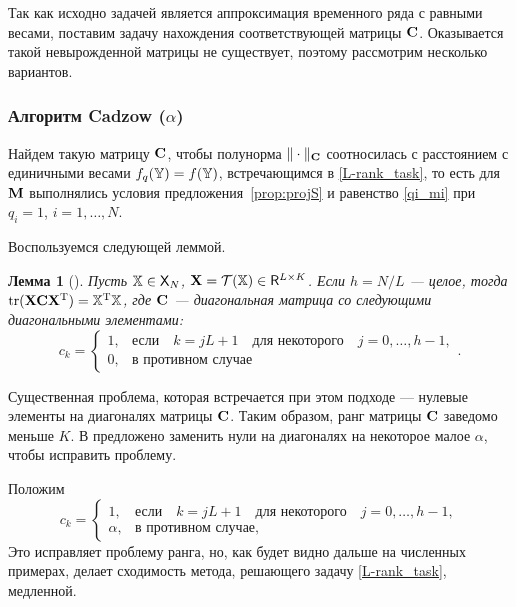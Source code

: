 \documentclass[12pt,a4paper,fleqn,leqno]{article}
\DeclareMathOperator{\tr}{tr}
\newtheorem{lemma}{Лемма}
\begin{document}
Так как исходно задачей является аппроксимация временного ряда с равными весами, поставим задачу нахождения соответствующей матрицы $\mathbf{C}$.
Оказывается такой невырожденной матрицы не существует, поэтому рассмотрим несколько вариантов.

\subsubsection{Алгоритм Cadzow ($\alpha$)}
\label{sec:cadzow_alpha}
Найдем такую матрицу $\mathbf{C}$, чтобы полунорма $\|\cdot\|_{\mathbf{C}}$ соотносилась с расстоянием с единичными весами $f_q(\mathbb{Y}) = f(\mathbb{Y})$, встречающимся в \eqref{L-rank_task}, то есть для $\mathbf{M}$ выполнялись условия предложения~\ref{prop:projS} и равенство \eqref{qi_mi} при $q_i = 1$, $i=1,\ldots,N$.

Воспользуемся следующей леммой.

\begin{lemma}[\cite{Gillard2014}]
\label{zhiglemma}
Пусть $\mathbb{X} \in \mathsf{X}_N$, $\mathbf{X} = \mathcal{T}(\mathbb{X}) \in \mathsf{R}^{L \times K}$. Если $h = N/L$ --- целое, тогда $\tr(\bfX \bfC \bfX^\rmT) = \tsX^\rmT \tsX$, где $\mathbf{C}$ --- диагональная матрица со следующими диагональными элементами:
\begin{equation*}
c_k = \begin{cases}
1, & \text{если} \quad k = jL+1 \quad \text{для некоторого} \quad j = 0, \ldots, h-1, \\
0, & \text{в противном случае}
\end{cases}.
\end{equation*}
\end{lemma}

Существенная проблема, которая встречается при этом подходе --- нулевые элементы на диагоналях матрицы $\mathbf{C}$. Таким образом, ранг матрицы $\mathbf{C}$ заведомо меньше $K$. В \cite{Gillard2014} предложено заменить нули на диагоналях на некоторое малое $\alpha$, чтобы исправить проблему.

Положим
\begin{equation}\label{zhigweights}
c_k = \begin{cases}
1, & \text{если} \quad k = jL+1 \quad \text{для некоторого} \quad j = 0, \ldots, h-1, \\
\alpha, & \text{в противном случае,}
\end{cases}
\end{equation}
Это исправляет проблему ранга, но, как будет видно дальше на численных примерах, делает сходимость метода, решающего задачу \eqref{L-rank_task}, медленной.
\end{document}
